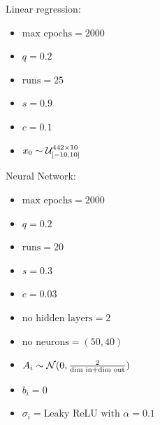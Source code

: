 \documentclass[10pt,conference,compsocconf]{IEEEtran}
\begin{document}
\medskip

\noindent Linear regression:

\begin{itemize}
	\item $\text{max epochs} = 2000$
	\item $q = 0.2$
	\item $\text{runs} = 25$
	\item $s = 0.9$
	\item $c = 0.1$
	\item $x_0 \sim {\cal U}_{[-10, 10]}^{442\times10}$
\end{itemize}

\medskip

\noindent Neural Network:

\begin{itemize}
	\item $\text{max epochs} = 2000$
	\item $q = 0.2$
	\item $\text{runs} = 20$
	\item $s = 0.3$
	\item $c = 0.03$
	\item $\text{no hidden layers} = 2$
	\item $\text{no neurons} = (50,40)$
	\item $A_i \sim {\cal N} (0, \frac{2}{\text{dim in} + \text{dim out}})$
	\item $b_i = 0$
	\item $\sigma_i = \text{Leaky ReLU with } \alpha = 0.1$
\end{itemize}

\newpage


\end{document}
